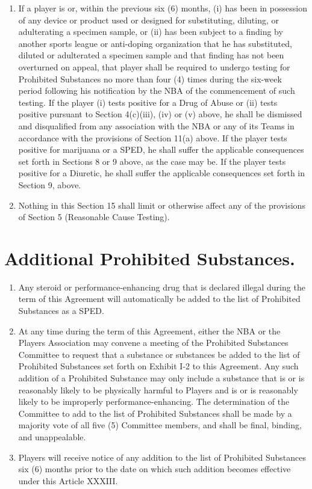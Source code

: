 \documentclass[
]{book}
\providecommand{\tightlist}{%
  \setlength{\itemsep}{0pt}\setlength{\parskip}{0pt}}
\begin{document}
\begin{enumerate}
\item
  If a player is or, within the previous six (6) months, (i) has been in possession of any device or product used or designed for substituting, diluting, or adulterating a specimen sample, or (ii) has been subject to a finding by another sports league or anti-doping organization that he has substituted, diluted or adulterated a specimen sample and that finding has not been overturned on appeal, that player shall be required to undergo testing for Prohibited Substances no more than four (4) times during the six-week period following his notification by the NBA of the commencement of such testing. If the player (i) tests positive for a Drug of Abuse or (ii) tests positive pursuant to Section 4(c)(iii), (iv) or (v) above, he shall be dismissed and disqualified from any association with the NBA or any of its Teams in accordance with the provisions of Section 11(a) above. If the player tests positive for marijuana or a SPED, he shall suffer the applicable consequences set forth in Sections 8 or 9 above, as the case may be. If the player tests positive for a Diuretic, he shall suffer the applicable consequences set forth in Section 9, above.
\item
  Nothing in this Section 15 shall limit or otherwise affect any of the provisions of Section 5 (Reasonable Cause Testing).
\end{enumerate}

\hypertarget{additional-prohibited-substances.}{%
\section{Additional Prohibited Substances.}\label{additional-prohibited-substances.}}

\begin{enumerate}
\def\labelenumi{(\alph{enumi})}
\tightlist
\item
  Any steroid or performance-enhancing drug that is declared illegal during the term of this Agreement will automatically be added to the list of Prohibited Substances as a SPED.
\item
  At any time during the term of this Agreement, either the NBA or the Players Association may convene a meeting of the Prohibited Substances Committee to request that a substance or substances be added to the list of Prohibited Substances set forth on Exhibit I-2 to this Agreement. Any such addition of a Prohibited Substance may only include a substance that is or is reasonably likely to be physically harmful to Players and is or is reasonably likely to be improperly performance-enhancing. The determination of the Committee to add to the list of Prohibited Substances shall be made by a majority vote of all five (5) Committee members, and shall be final, binding, and unappealable.
\item
  Players will receive notice of any addition to the list of Prohibited Substances six (6) months prior to the date on which such addition becomes effective under this Article XXXIII.
\end{enumerate}
\end{document}
